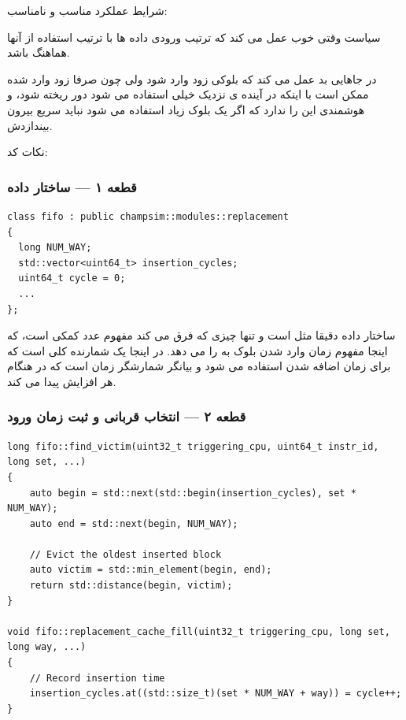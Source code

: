 \documentclass[12pt,a4paper]{article}
\begin{document}
شرایط عملکرد مناسب و نامناسب:

سیاست  وقتی خوب عمل می کند که ترتیب ورودی داده ها با ترتیب استفاده از آنها هماهنگ باشد.

در جاهایی بد عمل می کند که بلوکی زود وارد  شود ولی چون صرفا زود وارد شده ممکن است با اینکه در آینده ی نزدیک خیلی استفاده می شود دور ریخته شود، و هوشمندی این را ندارد که اگر یک بلوک زیاد استفاده می شود نباید سریع بیرون بیندازدش.

نکات کد:

\subsubsection{قطعه ۱ — ساختار داده}

\begin{latin}
\begin{lstlisting}
class fifo : public champsim::modules::replacement
{
  long NUM_WAY;
  std::vector<uint64_t> insertion_cycles;
  uint64_t cycle = 0;
  ...
};
\end{lstlisting}
\end{latin}

ساختار داده دقیقا مثل  است و تنها چیزی که فرق می کند مفهوم عدد کمکی است، که اینجا مفهوم زمان وارد شدن بلوک به  را می دهد.  در اینجا یک شمارنده کلی است که برای زمان اضافه شدن استفاده می شود و بیانگر شمارشگر زمان است که در هنگام هر  افزایش پیدا می کند.

\subsubsection{قطعه ۲ — انتخاب قربانی و ثبت زمان ورود}

\begin{latin}
\begin{lstlisting}
long fifo::find_victim(uint32_t triggering_cpu, uint64_t instr_id, long set, ...)
{
    auto begin = std::next(std::begin(insertion_cycles), set * NUM_WAY);
    auto end = std::next(begin, NUM_WAY);

    // Evict the oldest inserted block
    auto victim = std::min_element(begin, end);
    return std::distance(begin, victim);
}

void fifo::replacement_cache_fill(uint32_t triggering_cpu, long set, long way, ...)
{
    // Record insertion time
    insertion_cycles.at((std::size_t)(set * NUM_WAY + way)) = cycle++;
}
\end{lstlisting}
\end{latin}
\end{document}
